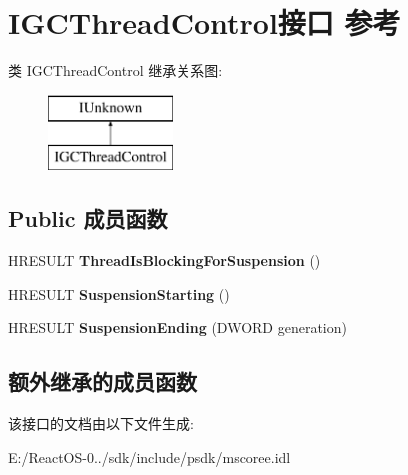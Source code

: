 \hypertarget{interface_i_g_c_thread_control}{}\section{I\+G\+C\+Thread\+Control接口 参考}
\label{interface_i_g_c_thread_control}
类 I\+G\+C\+Thread\+Control 继承关系图\+:\begin{figure}[H]
\begin{center}
\leavevmode
\includegraphics[height=2.000000cm]{interface_i_g_c_thread_control}
\end{center}
\end{figure}
\subsection*{Public 成员函数}
\begin{DoxyCompactItemize}
\item 
\mbox{\label{interface_i_g_c_thread_control_a5771ddec1d23fb6bf3dd9212ffc09ec6}} 
H\+R\+E\+S\+U\+LT {\bfseries Thread\+Is\+Blocking\+For\+Suspension} ()
\item 
\mbox{\label{interface_i_g_c_thread_control_ad87fec5d151a8177adc5e5c737e24fe6}} 
H\+R\+E\+S\+U\+LT {\bfseries Suspension\+Starting} ()
\item 
\mbox{\label{interface_i_g_c_thread_control_a4d3dee951ebcdcccf6672f5d40e0b403}} 
H\+R\+E\+S\+U\+LT {\bfseries Suspension\+Ending} (D\+W\+O\+RD generation)
\end{DoxyCompactItemize}
\subsection*{额外继承的成员函数}


该接口的文档由以下文件生成\+:\begin{DoxyCompactItemize}
\item 
E\+:/\+React\+O\+S-\/0../sdk/include/psdk/mscoree.\+idl\end{DoxyCompactItemize}
